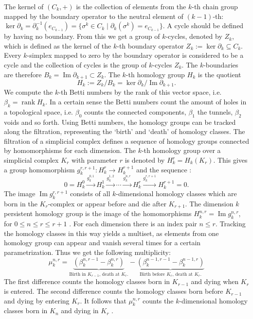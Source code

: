 \documentclass[runningheads]{llncs}
\DeclareMathOperator{\Ima}{\text{Im}}
\DeclareMathOperator{\rank}{\text{rank}}
\begin{document}
The kernel of $(C_k,+)$ is the collection of elements from the $k$-th chain group mapped by the boundary operator to the neutral element of $(k-1)$-th: $\ker \partial_k = \partial_k^{-1}(e_{C_{k-1}}) = \{\sigma^k \in C_k \; \vert \; \partial_k(\sigma^k)= e_{C_{k-1}}\}$. A cycle should be defined by having no boundary. From this we get a group of $k$-cycles, denoted by $Z_k$, which is defined as the kernel of the $k$-th boundary operator $Z_k := \ker \partial_k \subseteq C_k$. Every $k$-simplex mapped to zero by the boundary operator is considered to be a cycle and the collection of cycles is the group of $k$-cycles $Z_k$. The $k$-boundaries are therefore $B_k = \Ima \partial_{k+1} \subset Z_k$. The $k$-th homology group $H_k$ is the quotient
\begin{equation}
  H_k := Z_k / B_k = \ker \partial_k / \Ima \partial_{k+1}.
\end{equation}
We compute the $k$-th Betti numbers by the rank of this vector space, i.e. $\beta_k = \rank H_k$. In a certain sense the Betti numbers count the amount of holes in a topological space, i.e. $\beta_0$ counts the connected components, $\beta_1$ the tunnels, $\beta_2$ voids and so forth. Using Betti numbers, the homology groups can be tracked along the filtration, representing the `birth' and `death' of homology classes. The filtration of a simplicial complex defines a sequence of homology groups connected by homomorphisms for each dimension. The $k$-th homology group over a simplicial complex $K_r$ with parameter $r$ is denoted by $H_k^r = H_k(K_r)$. This gives a group homomorphism $g^{r,r+1}_k: H_k^r \rightarrow H_k^{r+1}$ and the sequence \cite{edelsbrunner2008persistent}:
\begin{equation}
0 = H_k^0 \xrightarrow{g^{0,1}_k} H_k^1 \xrightarrow{g^{1,2}_k} \cdots \xrightarrow{g^{n,r}_k} H_k^r \xrightarrow{g^{r,r+1}_k} H_k^{r+1} = 0.
\end{equation}
The image $\Ima g^{r,r+1}_k$ consists of all $k$-dimensional homology classes which are born in the $K_r$-complex or appear before and die after $K_{r+1}$. The dimension $k$ persistent homology group is the image of the homomorphisms $H_k^{n,r} = \Ima g_k^{n,r}$, for $0\leq n \leq r \leq r+1$ \cite{edelsbrunner2008persistent}. For each dimension there is an index pair $n \leq r$. Tracking the homology classes in this way yields a multiset, as elements from one homology group can appear and vanish several times for a certain parametrization. Thus we get the following multiplicity:
\begin{equation}
\mu^{n,r}_k = \underbrace{(\beta_k^{n,r-1} - \beta_k^{n,r})}_{\text{Birth in $K_{r-1}$, death at $K_r$.}} - \underbrace{(\beta_k^{n-1,r-1}-\beta_k^{n-1,r})}_{\text{Birth before $K_r$, death at $K_r$.}}
\end{equation}
The first difference counts the homology classes born in $K_{r-1}$ and dying when $K_r$ is entered. The second difference counts the homology classes born before $K_{r-1}$ and dying by entering $K_r$. It follows that $\mu^{n,r}_k$ counts the $k$-dimensional homology classes born in $K_n$ and dying in $K_r$ \cite{edelsbrunner2008persistent}.
\end{document}
